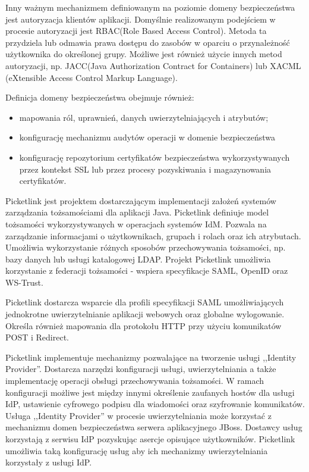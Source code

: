 		Inny ważnym mechanizmem definiowanym na poziomie domeny bezpieczeństwa jest autoryzacja klientów aplikacji. Domyślnie realizowanym podejściem w procesie autoryzacji jest RBAC(Role Based Access Control). Metoda ta przydziela lub odmawia prawa dostępu do zasobów w oparciu o przynależność użytkownika do określonej grupy. Możliwe jest również użycie innych metod autoryzacji, np. JACC(Java Authorization Contract for Containers) lub XACML (eXtensible Access Control Markup Language). 

		Definicja domeny bezpieczeństwa obejmuje również:

		\begin{itemize}
			\item mapowania ról, uprawnień, danych uwierzytelniających i atrybutów; 
			\item konfigurację mechanizmu audytów operacji w domenie bezpieczeństwa
			\item konfigurację repozytorium certyfikatów bezpieczeństwa wykorzystywanych przez kontekst SSL lub przez procesy pozyskiwania i magazynowania certyfikatów.
		\end{itemize}


\label{sec:picketlink}

Picketlink jest projektem dostarczającym implementacji założeń systemów zarządzania tożsamościami dla aplikacji Java. Picketlink definiuje model tożsamości wykorzystywanych w operacjach systemów IdM. Pozwala na zarządzanie informacjami o użytkownikach, grupach i rolach oraz ich atrybutach. Umożliwia wykorzystanie różnych sposobów przechowywania tożsamości, np. bazy danych lub usługi katalogowej LDAP. Projekt Picketlink umożliwia korzystanie z federacji tożsamości - wspiera specyfikacje SAML, OpenID oraz WS-Trust\cite{PicketLink13}.

Picketlink dostarcza wsparcie dla profili specyfikacji SAML umożliwiających jednokrotne uwierzytelnianie aplikacji webowych oraz globalne wylogowanie. Określa również mapowania dla protokołu HTTP przy użyciu komunikatów POST i Redirect. 

Picketlink implementuje mechanizmy pozwalające na tworzenie usługi ,,Identity Provider''. Dostarcza narzędzi konfiguracji usługi, uwierzytelniania a także implementację operacji obsługi przechowywania tożsamości. W ramach konfiguracji możliwe jest między innymi określenie zaufanych hostów dla usługi IdP, ustawienie cyfrowego podpisu dla wiadomości oraz szyfrowanie komunikatów. Usługa ,,Identity Provider'' w procesie uwierzytelniania może korzystać z mechanizmu domen bezpieczeństwa serwera aplikacyjnego JBoss. Dostawcy usług korzystają z serwisu IdP pozyskując asercje opisujące użytkowników. Picketlink umożliwia taką konfigurację usług aby ich mechanizmy uwierzytelniania korzystały z usługi IdP.

